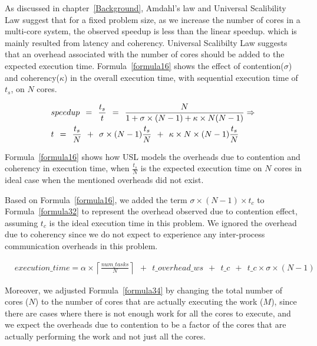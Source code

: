 As discussed in chapter~\ref{Background}, Amdahl's law and Universal Scalibility Law suggest that for a fixed problem size, as we increase the number of cores in a multi-core system, the observed speedup is less than the linear speedup. which is mainly resulted from latency and coherency.
Universal Scalibilty Law\cite{gunther2007guerrilla} suggests that an overhead associated with the number of cores should be added to the expected execution time. Formula~\ref{formula16} shows the effect of contention($\sigma$) and coherency($\kappa$) in the overall execution time, with sequential execution time of $t_s$, on $N$ cores.

\begin{equation}\label{formula16}
\begin{aligned}
 &speed\-up\:\:=\:\:\frac{t_s}{t}\:\:=\:\:\frac{N}{1+\sigma\times{(N-1)}+\kappa\times{N(N-1)}}\Rightarrow\\
 &t\:\:=\:\:\frac{t_s}{N}\:\:+\:\:\sigma\times{(N-1)}\frac{t_s}{N}\:\:+\:\:\kappa\times{{N\times(N-1)}\frac{t_s}{N}} 
\end{aligned}
\end{equation}
\vspace{\baselineskip}

Formula~\ref{formula16} shows how USL models the overheads due to contention and coherency in execution time, when $\frac{t_s}{N}$ is the expected execution time on $N$ cores in ideal case when the mentioned overheads did not exist.

Based on Formula~\ref{formula16}, we added the term $\sigma\times(N-1)\times{t_c}$ to Formula~\ref{formula32} to represent the overhead observed due to contention effect, assuming $t_c$ is the ideal execution time in this problem. We ignored the overhead due to coherency since we do not expect to experience any inter-process communication overheads in this problem.

\begin{equation}\label{formula34}
\begin{aligned}
&execution\_time = 
\alpha\times{\left\lceil{\frac{num\_{tasks}}{N}}\right\rceil\:\:+\:\:t\_{overhead\_{ws}}\:\:+\:\:t\_c\:\:+\:\:t\_c\times{\sigma\times(N-1)}}
\end{aligned}
\end{equation}
 
Moreover, we adjusted Formula~\ref{formula34} by changing the total number of cores ($N$) to the number of cores that are actually executing the work ($M$), since there are cases where there is not enough work for all the cores to execute, and we expect the overheads due to contention to be a factor of the cores that are actually performing the work and not just all the cores.

